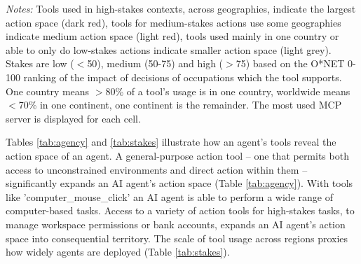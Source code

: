 \documentclass[manuscript,screen,nonacm,oneside]{acmart}
\begin{document}
\begin{table}[htbp]
\centering
\caption{AI agent action tool examples by geography and consequentiality.}
\small
{}
\begin{minipage}{\linewidth}
\scriptsize
\textit{Notes: }{Tools used in high-stakes contexts, across geographies, indicate the largest action space (dark red), tools for medium-stakes actions use some geographies indicate medium action space (light red), tools used mainly in one country or able to only do low-stakes actions indicate smaller action space (light grey). Stakes are low ($<$50), medium (50-75) and high ($>$75) based on the O*NET 0-100 ranking of the impact of decisions of occupations which the tool supports. One country means $>$80\% of a tool's usage is in one country, worldwide means $<$70\% in one continent, one continent is the remainder. The most used MCP server is displayed for each cell.}
\end{minipage}
\label{tab:stakes}
\end{table}
Tables \ref{tab:agency} and \ref{tab:stakes} illustrate how an agent's tools reveal the action space of an agent. A general-purpose action tool -- one that permits both access to unconstrained environments and direct action within them -- significantly expands an AI agent's action space (Table \ref{tab:agency}). With tools like 'computer\_mouse\_click' an AI agent is able to perform a wide range of computer-based tasks. 
Access to a variety of action tools for high-stakes tasks, to manage workspace permissions or bank accounts, expands an AI agent's action space into consequential territory. The scale of tool usage across regions proxies how widely agents are deployed (Table \ref{tab:stakes}).
\end{document}
